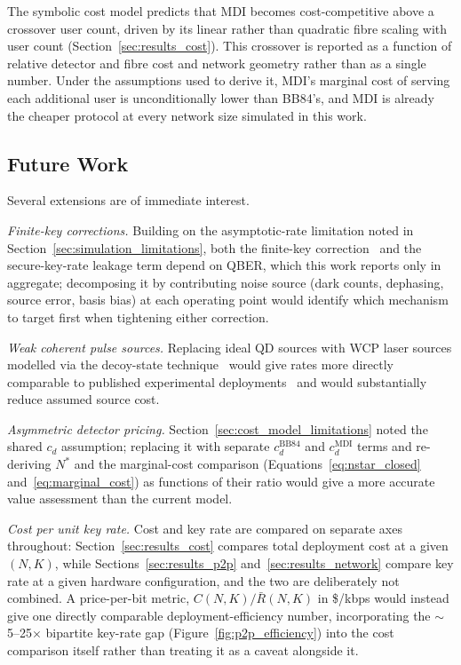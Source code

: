 \documentclass[12pt]{article}
\begin{document}
The symbolic cost model predicts that MDI becomes cost-competitive above a crossover user count, driven by its linear rather than quadratic fibre scaling with user count (Section~\ref{sec:results_cost}). This crossover is reported as a function of relative detector and fibre cost and network geometry rather than as a single number. Under the assumptions used to derive it, MDI's marginal cost of serving each additional user is unconditionally lower than BB84's, and MDI is already the cheaper protocol at every network size simulated in this work.

\subsection{Future Work}
\label{sec:future_work}

Several extensions are of immediate interest.

\textit{Finite-key corrections.} Building on the asymptotic-rate limitation noted in Section~\ref{sec:simulation_limitations}, both the finite-key correction~\cite{Song-2012} and the secure-key-rate leakage term depend on QBER, which this work reports only in aggregate; decomposing it by contributing noise source (dark counts, dephasing, source error, basis bias) at each operating point would identify which mechanism to target first when tightening either correction.

\textit{Weak coherent pulse sources.} Replacing ideal QD sources with WCP laser sources modelled via the decoy-state technique~\cite{Lo_decoys} would give rates more directly comparable to published experimental deployments~\cite{Tang_2016, Berrevoets_2022, Dynes_2019} and would substantially reduce assumed source cost.

\textit{Asymmetric detector pricing.} Section~\ref{sec:cost_model_limitations} noted the shared $c_d$ assumption; replacing it with separate $c_d^\text{BB84}$ and $c_d^\text{MDI}$ terms and re-deriving $N^*$ and the marginal-cost comparison (Equations~\ref{eq:nstar_closed} and~\ref{eq:marginal_cost}) as functions of their ratio would give a more accurate value assessment than the current model.

\textit{Cost per unit key rate.} Cost and key rate are compared on separate axes throughout: Section~\ref{sec:results_cost} compares total deployment cost at a given $(N,K)$, while Sections~\ref{sec:results_p2p} and~\ref{sec:results_network} compare key rate at a given hardware configuration, and the two are deliberately not combined. A price-per-bit metric, $C(N,K)/\bar R(N,K)$ in \$/kbps would instead give one directly comparable deployment-efficiency number, incorporating the $\sim$5--25$\times$ bipartite key-rate gap (Figure~\ref{fig:p2p_efficiency}) into the cost comparison itself rather than treating it as a caveat alongside it.
\end{document}
